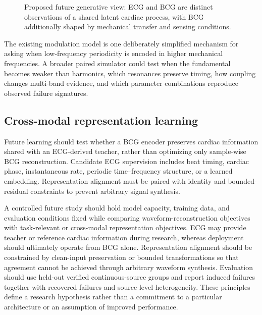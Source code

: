 \documentclass[10pt,twocolumn]{article}
\begin{document}
\begin{figure}[t]
\centering
{}
\caption{Proposed future generative view: ECG and BCG are distinct observations of a shared latent cardiac process, with BCG additionally shaped by mechanical transfer and sensing conditions.}
\label{fig:latent}
\end{figure}

The existing modulation model is one deliberately simplified mechanism for asking when low-frequency periodicity is encoded in higher mechanical frequencies. A broader paired simulator could test when the fundamental becomes weaker than harmonics, which resonances preserve timing, how coupling changes multi-band evidence, and which parameter combinations reproduce observed failure signatures.

\subsection{Cross-modal representation learning}
Future learning should test whether a BCG encoder preserves cardiac information shared with an ECG-derived teacher, rather than optimizing only sample-wise BCG reconstruction. Candidate ECG supervision includes beat timing, cardiac phase, instantaneous rate, periodic time--frequency structure, or a learned embedding. Representation alignment must be paired with identity and bounded-residual constraints to prevent arbitrary signal synthesis.

A controlled future study should hold model capacity, training data, and evaluation conditions fixed while comparing waveform-reconstruction objectives with task-relevant or cross-modal representation objectives. ECG may provide teacher or reference cardiac information during research, whereas deployment should ultimately operate from BCG alone. Representation alignment should be constrained by clean-input preservation or bounded transformations so that agreement cannot be achieved through arbitrary waveform synthesis. Evaluation should use held-out verified continuous-source groups and report induced failures together with recovered failures and source-level heterogeneity. These principles define a research hypothesis rather than a commitment to a particular architecture or an assumption of improved performance.
\end{document}
